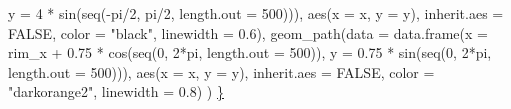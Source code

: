 \documentclass[
  9pt,
  ignorenonframetext,
  aspectratio=169]{beamer}
\newenvironment{Shaded}{\begin{snugshade}}{\end{snugshade}}
\newcommand{\AttributeTok}[1]{\textcolor[rgb]{0.00,0.34,0.68}{#1}}
\newcommand{\ConstantTok}[1]{\textcolor[rgb]{0.67,0.33,0.00}{#1}}
\newcommand{\DecValTok}[1]{\textcolor[rgb]{0.69,0.50,0.00}{#1}}
\newcommand{\ErrorTok}[1]{\textcolor[rgb]{0.75,0.01,0.01}{\underline{#1}}}
\newcommand{\FloatTok}[1]{\textcolor[rgb]{0.69,0.50,0.00}{#1}}
\newcommand{\FunctionTok}[1]{\textcolor[rgb]{0.39,0.29,0.61}{#1}}
\newcommand{\NormalTok}[1]{\textcolor[rgb]{0.12,0.11,0.11}{#1}}
\newcommand{\SpecialCharTok}[1]{\textcolor[rgb]{0.24,0.68,0.91}{#1}}
\newcommand{\StringTok}[1]{\textcolor[rgb]{0.75,0.01,0.01}{#1}}
\begin{document}
\begin{frame}[fragile]{}
\begin{Shaded}
\begin{Highlighting}[]
                                \AttributeTok{y =} \DecValTok{4} \SpecialCharTok{*} \FunctionTok{sin}\NormalTok{(}\FunctionTok{seq}\NormalTok{(}\SpecialCharTok{{-}}\NormalTok{pi}\SpecialCharTok{/}\DecValTok{2}\NormalTok{, pi}\SpecialCharTok{/}\DecValTok{2}\NormalTok{, }\AttributeTok{length.out =} \DecValTok{500}\NormalTok{))),}
              \FunctionTok{aes}\NormalTok{(}\AttributeTok{x =}\NormalTok{ x, }\AttributeTok{y =}\NormalTok{ y), }\AttributeTok{inherit.aes =} \ConstantTok{FALSE}\NormalTok{, }\AttributeTok{color =} \StringTok{"black"}\NormalTok{, }\AttributeTok{linewidth =} \FloatTok{0.6}\NormalTok{),}
    \FunctionTok{geom\_path}\NormalTok{(}\AttributeTok{data =} \FunctionTok{data.frame}\NormalTok{(}\AttributeTok{x =}\NormalTok{ rim\_x }\SpecialCharTok{+} \FloatTok{0.75} \SpecialCharTok{*} \FunctionTok{cos}\NormalTok{(}\FunctionTok{seq}\NormalTok{(}\DecValTok{0}\NormalTok{, }\DecValTok{2}\SpecialCharTok{*}\NormalTok{pi, }\AttributeTok{length.out =} \DecValTok{500}\NormalTok{)),}
                                \AttributeTok{y =} \FloatTok{0.75} \SpecialCharTok{*} \FunctionTok{sin}\NormalTok{(}\FunctionTok{seq}\NormalTok{(}\DecValTok{0}\NormalTok{, }\DecValTok{2}\SpecialCharTok{*}\NormalTok{pi, }\AttributeTok{length.out =} \DecValTok{500}\NormalTok{))),}
              \FunctionTok{aes}\NormalTok{(}\AttributeTok{x =}\NormalTok{ x, }\AttributeTok{y =}\NormalTok{ y), }\AttributeTok{inherit.aes =} \ConstantTok{FALSE}\NormalTok{, }\AttributeTok{color =} \StringTok{"darkorange2"}\NormalTok{, }\AttributeTok{linewidth =} \FloatTok{0.8}\NormalTok{)}
\NormalTok{  )}
\ErrorTok{\}}
\end{Highlighting}
\end{Shaded}
\end{frame}
\end{document}
